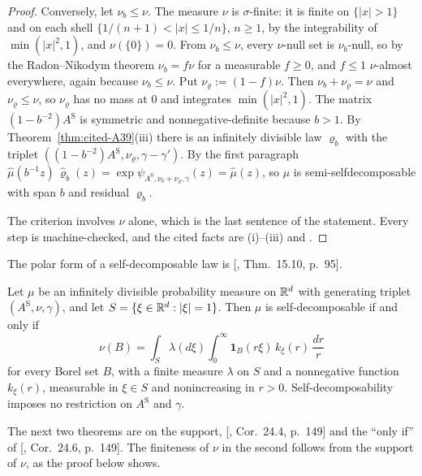 \begin{proof}
Conversely, let $\nu_b \le \nu$. The measure $\nu$ is $\sigma$-finite: it is finite on
$\{|x| > 1\}$ and on each shell $\{1/(n+1) < |x| \le 1/n\}$, $n \ge 1$, by the integrability of
$\min(|x|^2, 1)$, and $\nu(\{0\}) = 0$. From $\nu_b \le \nu$, every $\nu$-null set is
$\nu_b$-null, so by the Radon--Nikodym theorem $\nu_b = f\nu$ for a measurable $f \ge 0$, and
$f \le 1$ $\nu$-almost everywhere, again because $\nu_b \le \nu$. Put $\nu_\varrho := (1 - f)\nu$.
Then $\nu_b + \nu_\varrho = \nu$ and $\nu_\varrho \le \nu$, so $\nu_\varrho$ has no mass at $0$ and
integrates $\min(|x|^2, 1)$. The matrix
$(1 - b^{-2})A^{\mathrm S}$ is symmetric and nonnegative-definite because $b > 1$. By
Theorem~\ref{thm:cited-A39}(iii) there is an infinitely divisible law $\varrho_b$ with the triplet
$((1 - b^{-2})A^{\mathrm S}, \nu_\varrho, \gamma - \gamma')$. By the first paragraph
$\widehat\mu(b^{-1}z)\,\widehat\varrho_b(z) = \exp\psi_{A^{\mathrm S},\nu_b + \nu_\varrho,\gamma}(z) =
\widehat\mu(z)$, so $\mu$ is semi-selfdecomposable with span $b$ and residual $\varrho_b$.

The criterion involves $\nu$ alone, which is the last sentence of the statement. Every step is
machine-checked, and the cited facts are (i)--(iii) and .
\end{proof}

The polar form of a self-decomposable law is [, Thm.~15.10, p.~95].

\begin{theorem}
\label{thm:cited-A45}

Let $\mu$ be an infinitely divisible probability measure on $\mathbb{R}^d$ with generating triplet
$(A^{\mathrm S}, \nu, \gamma)$, and let $S = \{\xi \in \mathbb{R}^d : |\xi| = 1\}$. Then $\mu$ is self-decomposable if
and only if
\[
  \nu(B) = \int_S\lambda(d\xi)\int_0^\infty\mathbf{1}_B(r\xi)\,k_\xi(r)\,\frac{dr}{r}
\]
for every Borel set $B$, with a finite measure $\lambda$ on $S$ and a nonnegative function
$k_\xi(r)$, measurable in $\xi \in S$ and nonincreasing in $r > 0$. Self-decomposability imposes no
restriction on $A^{\mathrm S}$ and $\gamma$.
\end{theorem}

The next two theorems are on the support, [, Cor.~24.4, p.~149] and the
``only if'' of [, Cor.~24.6, p.~149]. The finiteness of $\nu$ in the second
follows from the support of $\nu$, as the proof below shows.

